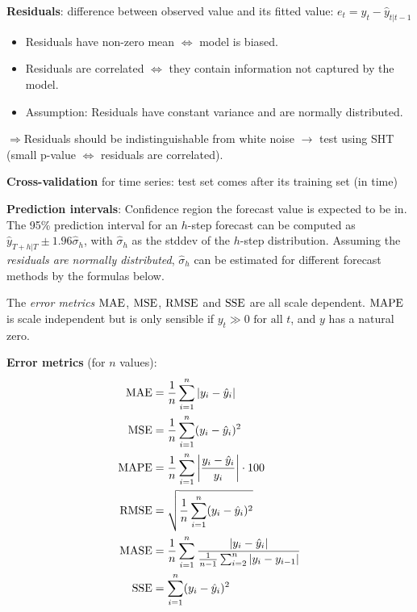 \begin{minipage}[t]{0.63\textwidth}
\textbf{Residuals}: difference between observed value and its fitted value: $ e_t = y_t - \hat{y}_{t|t-1} $
\begin{itemize}
    \item Residuals have non-zero mean \(\Leftrightarrow\) model is biased.
    \item Residuals are correlated \(\Leftrightarrow\) they contain information not captured by the model.
    \item Assumption: Residuals have constant variance and are normally distributed.
\end{itemize}
\(\Rightarrow\)Residuals should be indistinguishable from white noise \(\rightarrow\) test using SHT
(small p-value \(\Leftrightarrow\) residuals are correlated).\@

\vspace{2mm}
\textbf{Cross-validation} for time series: test set comes after its training set (in time)

\vspace{2mm}
\textbf{Prediction intervals}: Confidence region the forecast value is expected to be in.
The 95\% prediction interval for an $ h $-step forecast can be computed
as $ \hat{y}_{T+h|T} \pm 1.96 \hat{\sigma}_h $, with $ \hat{\sigma}_h $ as the stddev of the $ h $-step distribution.
Assuming the \emph{residuals are normally distributed},
$ \hat{\sigma}_h $ can be estimated for different forecast methods by the formulas below.

\vspace{8mm}

The \emph{error metrics} $ \operatorname{MAE} $, $ \operatorname{MSE} $, $ \operatorname{RMSE} $ and $ \operatorname{SSE} $ are all scale dependent.
$ \operatorname{MAPE} $ is scale independent but is only sensible if $ y_t \gg 0 \text{ for all } t $, and $ y $ has a natural zero.
\end{minipage}
\hfill
\begin{minipage}[t]{0.32\textwidth}
\textbf{Error metrics} (for \(n\) values):
\begin{align*}
    \operatorname{MAE} &= \frac{1}{n} \sum_{i=1}^{n} |y_i - \hat{y}_i| \\
    \operatorname{MSE} &= \frac{1}{n} \sum_{i=1}^{n} (y_i - \hat{y}_i)^2 \\
    \operatorname{MAPE} &= \frac{1}{n} \sum_{i=1}^{n} \left| \frac{y_i - \hat{y}_i}{y_i} \right| \cdot 100 \\
    \operatorname{RMSE} &= \sqrt{\frac{1}{n} \sum_{i=1}^{n} (y_i - \hat{y}_i)^2} \\
    \operatorname{MASE} &= \frac{1}{n} \sum_{i=1}^{n} \frac{|y_i - \hat{y}_i|}{\frac{1}{n-1} \sum_{i=2}^{n} |y_i - y_{i-1}|} \\
    \operatorname{SSE} &= \sum_{i=1}^{n} (y_i - \hat{y}_i)^2
\end{align*}
\end{minipage}

